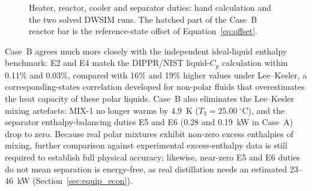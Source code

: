 \documentclass[10pt,a4paper]{article}
\begin{document}
\begin{figure}[H]
\caption{Heater, reactor, cooler and separator duties: hand calculation and the two solved DWSIM runs. The hatched part of the Case~B reactor bar is the reference-state offset of Equation~\eqref{eq:offset}.}
\label{fig:duties}
\end{figure}

Case~B agrees much more closely with the independent ideal-liquid enthalpy benchmark: E2 and E4 match the DIPPR/NIST liquid-$C_p$ calculation within 0.11\% and 0.03\%, compared with 16\% and 19\% higher values under Lee--Kesler, a corresponding-states correlation developed for non-polar fluids that overestimates the heat capacity of these polar liquids. Case~B also eliminates the Lee--Kesler mixing artefacts: MIX-1 no longer warms by 4.9~K ($T_3 = 25.00~^\circ$C), and the separator enthalpy-balancing duties E5 and E6 (0.28 and 0.19~kW in Case~A) drop to zero. Because real polar mixtures exhibit non-zero excess enthalpies of mixing, further comparison against experimental excess-enthalpy data is still required to establish full physical accuracy; likewise, near-zero E5 and E6 duties do not mean separation is energy-free, as real distillation needs an estimated 23--46~kW (Section~\ref{sec:equip_econ}).
\end{document}
